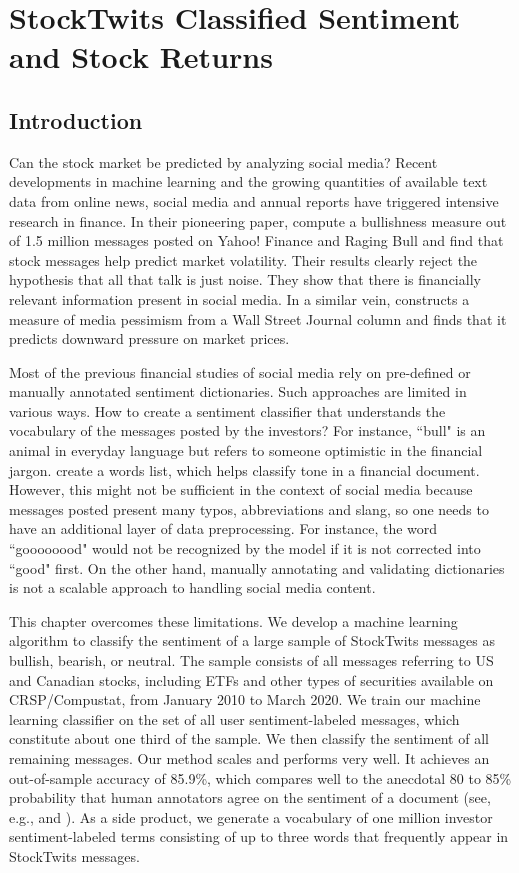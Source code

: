 \chapter{StockTwits Classified Sentiment and Stock Returns}

\section{Introduction}
\label{S:3.1}

Can the stock market be predicted by analyzing social media? Recent developments in machine learning and the growing quantities of available text data from online news, social media and annual reports have triggered intensive research in finance. In their pioneering paper, \citet{antweiler2004all} compute a bullishness measure out of 1.5 million messages posted on Yahoo! Finance and Raging Bull and find that stock messages help predict market volatility. Their results clearly reject the hypothesis that all that talk is just noise. They show that there is financially relevant information present in social media. In a similar vein, \citet{tet_07} constructs a measure of media pessimism from a Wall Street Journal column and finds that it predicts downward pressure on market prices. 

Most of the previous financial studies of social media rely on pre-defined or manually annotated sentiment dictionaries. Such approaches are limited in various ways. How to create a sentiment classifier that understands the vocabulary of the messages posted by the investors? For instance, ``bull" is an animal in everyday language but refers to someone optimistic in the financial jargon. \citet{loughran2011liability} create a words list, which helps classify tone in a financial document. However, this might not be sufficient in the context of social media because messages posted present many typos, abbreviations and slang, so one needs to have an additional layer of data preprocessing. For instance, the word ``goooooood" would not be recognized by the model if it is not corrected into ``good" first. On the other hand, manually annotating and validating dictionaries is not a scalable approach to handling social media content.

This chapter overcomes these limitations. We develop a machine learning algorithm to classify the sentiment of a large sample of StockTwits messages as bullish, bearish, or neutral. The sample consists of all messages referring to US and Canadian stocks, including ETFs and other types of securities available on CRSP/Compustat, from January 2010 to March 2020. We train our machine learning classifier on the set of all user sentiment-labeled messages, which constitute about one third of the sample. We then classify the sentiment of all remaining messages. Our method scales and performs very well. It achieves an out-of-sample accuracy of 85.9\%, which compares well to the anecdotal 80 to 85\% probability that human annotators agree on the sentiment of a document (see, e.g., \citet{wilson2005recognizing} and \citet{chen2020large}). As a side product, we generate a vocabulary of one million investor sentiment-labeled terms consisting of up to three words that frequently appear in StockTwits messages.

